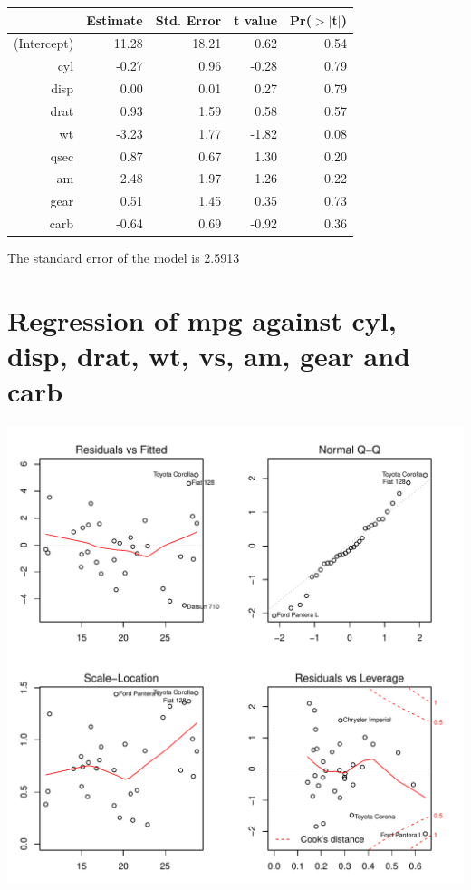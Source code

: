 \documentclass{article}\usepackage[]{graphicx}\usepackage[]{color}
\makeatletter
\def\maxwidth{ %
  \ifdim\Gin@nat@width>\linewidth
    \linewidth
  \else
    \Gin@nat@width
  \fi
}
\newenvironment{knitrout}{}{} %
\makeatother
\begin{document}
\begin{table}[ht]
\centering
\begin{tabular}{rrrrr}
  \hline
 & Estimate & Std. Error & t value & Pr($>$$|$t$|$) \\ 
  \hline
(Intercept) & 11.28 & 18.21 & 0.62 & 0.54 \\ 
  cyl & -0.27 & 0.96 & -0.28 & 0.79 \\ 
  disp & 0.00 & 0.01 & 0.27 & 0.79 \\ 
  drat & 0.93 & 1.59 & 0.58 & 0.57 \\ 
  wt & -3.23 & 1.77 & -1.82 & 0.08 \\ 
  qsec & 0.87 & 0.67 & 1.30 & 0.20 \\ 
  am & 2.48 & 1.97 & 1.26 & 0.22 \\ 
  gear & 0.51 & 1.45 & 0.35 & 0.73 \\ 
  carb & -0.64 & 0.69 & -0.92 & 0.36 \\ 
   \hline
\end{tabular}
\end{table}




The standard error of the model is 2.5913

\newpage

\section{Regression of mpg against cyl, disp, drat, wt, vs, am, gear and carb }
\begin{knitrout}
\color{fgcolor}

{\centering \includegraphics[width=\maxwidth]{figure/lm-cyl-disp-drat-wt-vs-am-gear-carb} 

}



\end{knitrout}
\end{document}
